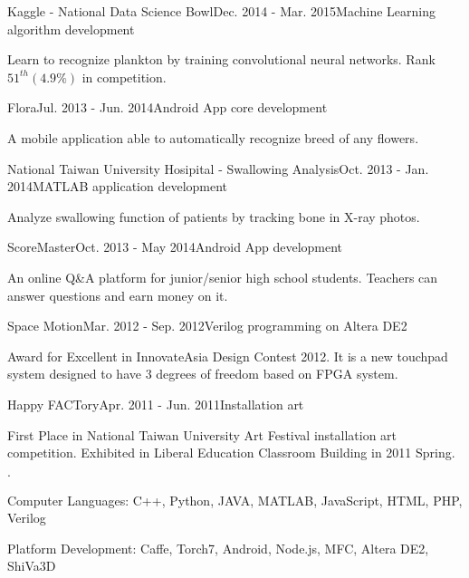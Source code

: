 \documentclass{joel_cv}
\begin{document}
\pagebreak


%
%


\begin{sectionContentNormal}{Kaggle - National Data Science Bowl}{Dec. 2014 - Mar. 2015}{Machine Learning algorithm development}
	\item Learn to recognize plankton by training convolutional neural networks. Rank $51^{th} (4.9\%)$ in competition.
\end{sectionContentNormal}

\begin{sectionContentNormal}{Flora}{Jul. 2013 - Jun. 2014}{Android App core development}
	\item A mobile application able to automatically recognize breed of any flowers.
\end{sectionContentNormal}

\begin{sectionContentNormal}{National Taiwan University Hosipital - Swallowing Analysis}{Oct. 2013 - Jan. 2014}{MATLAB application development}
	\item Analyze swallowing function of patients by tracking bone in X-ray photos.
\end{sectionContentNormal}

\begin{sectionContentNormal}{ScoreMaster}{Oct. 2013 - May 2014}{Android App development}
	\item An online Q\&A platform for junior/senior high school students. Teachers can answer questions and earn money on it.
\end{sectionContentNormal}

\begin{sectionContentNormal}{Space Motion}{Mar. 2012 - Sep. 2012}{Verilog programming on Altera DE2}
	\item Award for Excellent in InnovateAsia Design Contest 2012. It is a new touchpad system designed to have 3 degrees of freedom based on FPGA system.
\end{sectionContentNormal}

\begin{sectionContentNormal}{Happy FACTory}{Apr. 2011 - Jun. 2011}{Installation art}
	\item First Place in National Taiwan University Art Festival installation art competition. Exhibited in Liberal Education Classroom Building in 2011 Spring.
\end{sectionContentNormal}

%
%

\begin{sectionItemize}{$\cdot$}
	\item Computer Languages: C++, Python, JAVA, MATLAB, JavaScript, HTML, PHP, Verilog
	\item Platform Development: Caffe, Torch7, Android, Node.js, MFC, Altera DE2, ShiVa3D
\end{sectionItemize}
\end{document}
